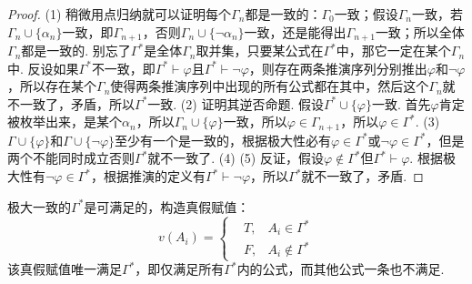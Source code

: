 \documentclass[main.tex]{subfiles}
\begin{document}
\begin{proof}
    (1) 稍微用点归纳就可以证明每个\(\Gamma_n\)都是一致的：\(\Gamma_0\)一致；假设\(\Gamma_n\)一致，若\(\Gamma_n \cup \{\alpha_n\}\)一致，即\(\Gamma_{n+1}\)，否则\(\Gamma_n \cup \{\neg \alpha_n\}\)一致，还是能得出\(\Gamma_{n+1}\)一致；所以全体\(\Gamma_n\)都是一致的. 别忘了\(\Gamma^*\)是全体\(\Gamma_n\)取并集，只要某公式在\(\Gamma^*\)中，那它一定在某个\(\Gamma_n\)中. 反设如果\(\Gamma^*\)不一致，即\(\Gamma^* \vdash \varphi\)且\(\Gamma^* \vdash \neg \varphi\)，则存在两条推演序列分别推出\(\varphi\)和\(\neg \varphi\)，所以存在某个\(\Gamma_n\)使得两条推演序列中出现的所有公式都在其中，然后这个\(\Gamma_n\)就不一致了，矛盾，所以\(\Gamma^*\)一致. \newline
    (2) 证明其逆否命题. 假设\(\Gamma^* \cup \{\varphi\}\)一致. 首先\(\varphi\)肯定被枚举出来，是某个\(\alpha_n\)，所以\(\Gamma_n \cup \{\varphi\}\)一致，所以\(\varphi \in \Gamma_{n+1}\)，所以\(\varphi \in \Gamma^*\). \newline
    (3) \(\Gamma \cup \{\varphi\}\)和\(\Gamma \cup \{\neg \varphi\}\)至少有一个是一致的，根据极大性必有\(\varphi \in \Gamma^*\)或\(\neg \varphi \in \Gamma^*\)，但是两个不能同时成立否则\(\Gamma^*\)就不一致了. \newline
    (4) 
    (5) 反证，假设\(\varphi \not \in \Gamma^*\)但\(\Gamma^* \vdash \varphi\). 根据极大性有\(\neg \varphi \in \Gamma^*\)，根据推演的定义有\(\Gamma^* \vdash \neg \varphi\)，所以\(\Gamma^*\)就不一致了，矛盾. 
\end{proof}

\begin{lemma}{}
    极大一致的\(\Gamma^*\)是可满足的，构造真假赋值：
    \[ v(A_i) = \left\{ \begin{aligned} &T, & A_i \in \Gamma^* \\ &F, & A_i \not \in \Gamma^* \end{aligned} \right.\]
    该真假赋值唯一满足\(\Gamma^*\)，即仅满足所有\(\Gamma^*\)内的公式，而其他公式一条也不满足.
\end{lemma}
\end{document}
